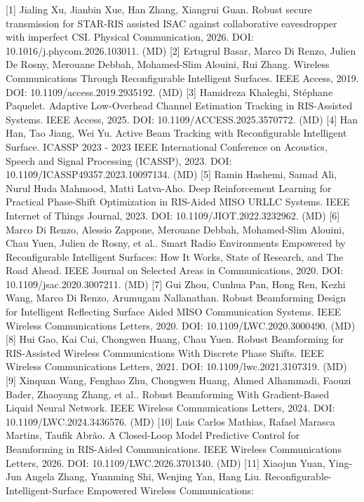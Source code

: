 \documentclass[10pt,twocolumn]{article}
\begin{document}
{[}1{]} Jialing Xu, Jianbin Xue, Han Zhang, Xiangrui Guan. Robust secure
transmission for STAR-RIS assisted ISAC against collaborative
eavesdropper with imperfect CSI. Physical Communication, 2026. DOI:
10.1016/j.phycom.2026.103011. (MD) {[}2{]} Ertugrul Basar, Marco Di
Renzo, Julien De Rosny, Merouane Debbah, Mohamed-Slim Alouini, Rui
Zhang. Wireless Communications Through Reconfigurable Intelligent
Surfaces. IEEE Access, 2019. DOI: 10.1109/access.2019.2935192. (MD)
{[}3{]} Hamidreza Khaleghi, Stéphane Paquelet. Adaptive Low-Overhead
Channel Estimation Tracking in RIS-Assisted Systems. IEEE Access, 2025.
DOI: 10.1109/ACCESS.2025.3570772. (MD) {[}4{]} Han Han, Tao Jiang, Wei
Yu. Active Beam Tracking with Reconfigurable Intelligent Surface. ICASSP
2023 - 2023 IEEE International Conference on Acoustics, Speech and
Signal Processing (ICASSP), 2023. DOI:
10.1109/ICASSP49357.2023.10097134. (MD) {[}5{]} Ramin Hashemi, Samad
Ali, Nurul Huda Mahmood, Matti Latva-Aho. Deep Reinforcement Learning
for Practical Phase-Shift Optimization in RIS-Aided MISO URLLC Systems.
IEEE Internet of Things Journal, 2023. DOI: 10.1109/JIOT.2022.3232962.
(MD) {[}6{]} Marco Di Renzo, Alessio Zappone, Merouane Debbah,
Mohamed-Slim Alouini, Chau Yuen, Julien de Rosny, et al.. Smart Radio
Environments Empowered by Reconfigurable Intelligent Surfaces: How It
Works, State of Research, and The Road Ahead. IEEE Journal on Selected
Areas in Communications, 2020. DOI: 10.1109/jsac.2020.3007211. (MD)
{[}7{]} Gui Zhou, Cunhua Pan, Hong Ren, Kezhi Wang, Marco Di Renzo,
Arumugam Nallanathan. Robust Beamforming Design for Intelligent
Reflecting Surface Aided MISO Communication Systems. IEEE Wireless
Communications Letters, 2020. DOI: 10.1109/LWC.2020.3000490. (MD)
{[}8{]} Hui Gao, Kai Cui, Chongwen Huang, Chau Yuen. Robust Beamforming
for RIS-Assisted Wireless Communications With Discrete Phase Shifts.
IEEE Wireless Communications Letters, 2021. DOI:
10.1109/lwc.2021.3107319. (MD) {[}9{]} Xinquan Wang, Fenghao Zhu,
Chongwen Huang, Ahmed Alhammadi, Faouzi Bader, Zhaoyang Zhang, et al..
Robust Beamforming With Gradient-Based Liquid Neural Network. IEEE
Wireless Communications Letters, 2024. DOI: 10.1109/LWC.2024.3436576.
(MD) {[}10{]} Luis Carlos Mathias, Rafael Marasca Martins, Taufik Abrão.
A Closed-Loop Model Predictive Control for Beamforming in RIS-Aided
Communications. IEEE Wireless Communications Letters, 2026. DOI:
10.1109/LWC.2026.3701340. (MD) {[}11{]} Xiaojun Yuan, Ying-Jun Angela
Zhang, Yuanming Shi, Wenjing Yan, Hang Liu.
Reconfigurable-Intelligent-Surface Empowered Wireless Communications:
\end{document}
